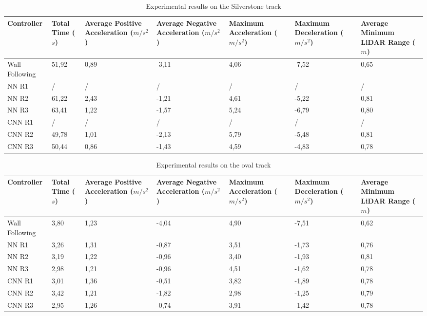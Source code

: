 \begin{table}[H]
\centering
\begin{tabularx}{\textwidth}{||X|X|X|X|X|X|X||} 
\hline
 Controller & Total Time ($s$) & Average Positive Acceleration ($m/s^2$)& Average Negative Acceleration ($m/s^2$) & Maximum Acceleration ($m/s^2$) & Maximum Deceleration ($m/s^2$) & Average Minimum LiDAR Range ($m$)\\ [0.5ex] 
 \hline\hline
Wall Following & 51,92 & 0,89 & -3,11 & 4,06 & -7,52 & 0,65\\[0.5ex] 
 \hline
 NN R1 & / & / & / & / & / & /\\[0.5ex] 
 \hline
 NN R2 & 61,22 & 2,43 & -1,21 & 4,61 & -5,22 & 0,81\\[0.5ex] 
 \hline
NN R3 & 63,41 & 1,22 & -1,57 & 5,24 & -6,79 & 0,80\\[0.5ex] 
 \hline
 CNN R1 & / & / & / & / & / & /\\[0.5ex] 
 \hline
 CNN R2 & 49,78 & 1,01 & -2,13 & 5,79 & -5,48 & 0,81\\[0.5ex] 
 \hline
 CNN R3 & 50,44 & 0,86 & -1,43 & 4,59 & -4,83 & 0,78\\[0.5ex] 
 \hline
\end{tabularx}
\caption{Experimental results on the Silverstone track}
\label{silverstone_results}
\end{table}


\begin{table}[H]
\centering
\begin{tabularx}{\textwidth}{||X|X|X|X|X|X|X||} 
\hline
 Controller & Total Time ($s$) & Average Positive Acceleration ($m/s^2$)& Average Negative Acceleration ($m/s^2$) & Maximum Acceleration ($m/s^2$) & Maximum Deceleration ($m/s^2$) & Average Minimum LiDAR Range ($m$)\\ [0.5ex] 
 \hline\hline
Wall Following & 3,80 & 1,23 & -4,04 & 4,90 & -7,51 & 0,62\\[0.5ex] 
 \hline
 NN R1 & 3,26 & 1,31 & -0,87 & 3,51 & -1,73 & 0,76\\[0.5ex] 
 \hline
 NN R2 & 3,19 & 1,22 & -0,96 & 3,40 & -1,93 & 0,81\\[0.5ex] 
 \hline
NN R3 & 2,98 & 1,21 & -0,96 & 4,51 & -1,62 & 0,78\\[0.5ex] 
 \hline
 CNN R1 & 3,01 & 1,36 & -0,51 & 3,82 & -1,89 & 0,78\\[0.5ex] 
 \hline
 CNN R2 & 3,42 & 1,21 & -1,82 & 2,98 & -1,25 & 0,79\\[0.5ex] 
 \hline
 CNN R3 & 2,95 & 1,26 & -0,74 & 3,91 & -1,42 & 0,78\\[0.5ex] 
 \hline
\end{tabularx}
\caption{Experimental results on the oval track}
\label{oval_results}
\end{table}

